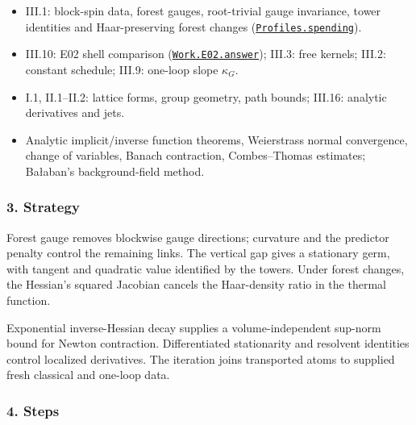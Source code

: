 \documentclass[
  letterpaper,
  11pt]{article}
\providecommand{\tightlist}{%
  \setlength{\itemsep}{0pt}\setlength{\parskip}{0pt}}
\begin{document}
\begin{itemize}
\tightlist
\item
  III.1: block-spin data, forest gauges, root-trivial gauge invariance,
  tower identities and Haar-preserving forest changes
  (\href{https://github.com/yang-mills-group/OpenAI-YM-20261028/blob/3456e5e75cf8d4cd558955a5c7638fba2d68f464/YM/PCalc/Profiles.lean\#L57-L77}{\texttt{Profiles.spending}}).
\item
  III.10: E02 shell comparison
  (\href{https://github.com/yang-mills-group/OpenAI-YM-20261028/blob/3456e5e75cf8d4cd558955a5c7638fba2d68f464/YM/Work/E02.lean\#L132-L244}{\texttt{Work.E02.answer}});
  III.3: free kernels; III.2: constant schedule; III.9: one-loop slope
  \(\kappa_G\).
\item
  I.1, II.1--II.2: lattice forms, group geometry, path bounds; III.16:
  analytic derivatives and jets.
\item
  Analytic implicit/inverse function theorems, Weierstrass normal
  convergence, change of variables, Banach contraction, Combes--Thomas
  estimates; Bałaban's background-field method.
\end{itemize}

\subsubsection{3. Strategy}\label{strategy-8}

Forest gauge removes blockwise gauge directions; curvature and the
predictor penalty control the remaining links. The vertical gap gives a
stationary germ, with tangent and quadratic value identified by the
towers. Under forest changes, the Hessian's squared Jacobian cancels the
Haar-density ratio in the thermal function.

Exponential inverse-Hessian decay supplies a volume-independent sup-norm
bound for Newton contraction. Differentiated stationarity and resolvent
identities control localized derivatives. The iteration joins
transported atoms to supplied fresh classical and one-loop data.

\subsubsection{4. Steps}\label{steps-8}
\end{document}

